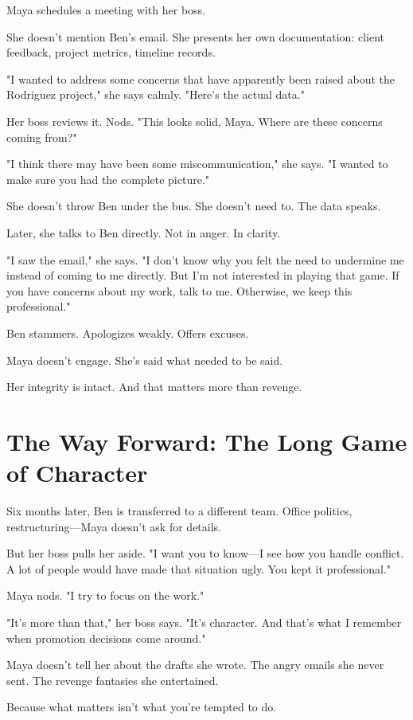 \documentclass[11pt,twoside]{book}
\begin{document}
Maya schedules a meeting with her boss.

She doesn't mention Ben's email. She presents her own documentation: client feedback, project metrics, timeline records.

"I wanted to address some concerns that have apparently been raised about the Rodriguez project," she says calmly. "Here's the actual data."

Her boss reviews it. Nods. "This looks solid, Maya. Where are these concerns coming from?"

"I think there may have been some miscommunication," she says. "I wanted to make sure you had the complete picture."

She doesn't throw Ben under the bus. She doesn't need to. The data speaks.

Later, she talks to Ben directly. Not in anger. In clarity.

"I saw the email," she says. "I don't know why you felt the need to undermine me instead of coming to me directly. But I'm not interested in playing that game. If you have concerns about my work, talk to me. Otherwise, we keep this professional."

Ben stammers. Apologizes weakly. Offers excuses.

Maya doesn't engage. She's said what needed to be said.

Her integrity is intact. And that matters more than revenge.

\section*{The Way Forward: The Long Game of Character}

Six months later, Ben is transferred to a different team. Office politics, restructuring—Maya doesn't ask for details.

But her boss pulls her aside. "I want you to know—I see how you handle conflict. A lot of people would have made that situation ugly. You kept it professional."

Maya nods. "I try to focus on the work."

"It's more than that," her boss says. "It's character. And that's what I remember when promotion decisions come around."

Maya doesn't tell her about the drafts she wrote. The angry emails she never sent. The revenge fantasies she entertained.

Because what matters isn't what you're tempted to do.
\end{document}
